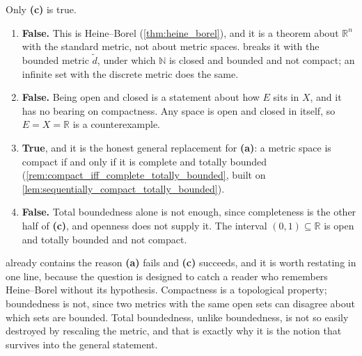 \begin{exercisesolution}
\label{sol:kobel_compactness_characterisation}
Only \textbf{(c)} is true.
\begin{enumerate}[label=\textbf{(\alph*)}]
  \item \textbf{False.} This is Heine--Borel (\cref{thm:heine_borel}), and it is a theorem about
    $\mathbb{R}^n$ with the standard metric, not about metric spaces. 
    breaks it with the bounded metric $\tilde d$, under which $\mathbb{N}$ is closed and bounded
    and not compact; an infinite set with the discrete metric does the same.
  \item \textbf{False.} Being open and closed is a statement about how $E$ sits in $X$, and it has
    no bearing on compactness. Any space is open and closed in itself, so $E = X = \mathbb{R}$ is
    a counterexample.
  \item \textbf{True}, and it is the honest general replacement for \textbf{(a)}: a metric space is
    compact if and only if it is complete and totally bounded
    (\cref{rem:compact_iff_complete_totally_bounded}, built on
    \cref{lem:sequentially_compact_totally_bounded}).
  \item \textbf{False.} Total boundedness alone is not enough, since completeness is the other half
    of \textbf{(c)}, and openness does not supply it. The interval $(0,1) \subseteq \mathbb{R}$ is
    open and totally bounded and not compact.
\end{enumerate}
\begin{remark}
 already contains the reason \textbf{(a)} fails and
\textbf{(c)} succeeds, and it is worth restating in one line, because the question is designed to
catch a reader who remembers Heine--Borel without its hypothesis. Compactness is a topological
property; boundedness is not, since two metrics with the same open sets can disagree about which
sets are bounded. Total boundedness, unlike boundedness, is not so easily destroyed by rescaling
the metric, and that is exactly why it is the notion that survives into the general statement.
\end{remark}
\end{exercisesolution}

